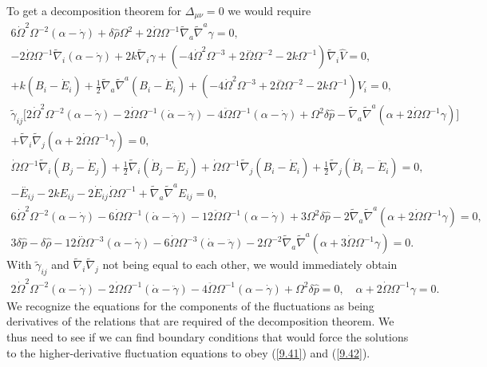 \documentclass[aps,onecolumn,10pt]{revtex4}
\numberwithin{equation}{section}
\numberwithin{equation}{section}
\begin{document}
To get a decomposition theorem for $\Delta_{\mu\nu}=0$ we would require 
%
\begin{eqnarray}
6 \dot{\Omega}^2 \Omega^{-2}(\alpha-\dot\gamma) + \delta \hat{\rho}{} \Omega^2 + 2 \dot{\Omega} \Omega^{-1} \tilde{\nabla}_{a}\tilde{\nabla}^{a}\gamma=0,&& 
\nonumber\\
 -2 \dot{\Omega} \Omega^{-1} \tilde{\nabla}_{i}(\alpha - \dot\gamma) + 2 k \tilde{\nabla}_{i}\gamma 
+(-4 \dot{\Omega}^2 \Omega^{-3}  + 2 \overset{..}{\Omega} \Omega^{-2}  - 2 k \Omega^{-1}) \tilde{\nabla}_{i}\hat{V}=0,&&
\nonumber\\
 +k(B_i-\dot E_i)+ \tfrac{1}{2} \tilde{\nabla}_{a}\tilde{\nabla}^{a}(B_{i} - \dot{E}_{i})
+ (-4 \dot{\Omega}^2 \Omega^{-3} + 2 \overset{..}{\Omega} \Omega^{-2} - 2 k \Omega^{-1})V_{i}=0,&&
\nonumber\\
 \tilde{\gamma}_{ij}\big[ 2 \dot{\Omega}^2 \Omega^{-2}(\alpha-\dot\gamma)
-2  \dot{\Omega} \Omega^{-1}(\dot\alpha -\ddot\gamma)-4\ddot\Omega\Omega^{-1}(\alpha-\dot\gamma)+ \Omega^2 \delta \hat{p}-\tilde\nabla_a\tilde\nabla^a( \alpha + 2\dot\Omega \Omega^{-1}\gamma) \big] &&
\nonumber\\
+\tilde\nabla_i\tilde\nabla_j( \alpha + 2\dot\Omega \Omega^{-1}\gamma)=0,&&
\nonumber\\
\dot{\Omega} \Omega^{-1} \tilde{\nabla}_{i}(B_{j}-\dot E_j)+\tfrac{1}{2} \tilde{\nabla}_{i}(\dot{B}_{j}-\ddot{E}_j)
+\dot{\Omega} \Omega^{-1} \tilde{\nabla}_{j}(B_{i}-\dot E_i)+\tfrac{1}{2} \tilde{\nabla}_{j}(\dot{B}_{i}-\ddot{E}_i)=0,&&
\nonumber\\
- \overset{..}{E}_{ij} - 2 k E_{ij} - 2 \dot{E}_{ij} \dot{\Omega} \Omega^{-1} + \tilde{\nabla}_{a}\tilde{\nabla}^{a}E_{ij}=0,&&
\nonumber\\
 6 \dot{\Omega}^2 \Omega^{-2}(\alpha-\dot\gamma)
-6  \dot{\Omega} \Omega^{-1}(\dot\alpha -\ddot\gamma)-12\ddot\Omega\Omega^{-1}(\alpha-\dot\gamma)+ 3\Omega^2 \delta \hat{p}-2\tilde\nabla_a\tilde\nabla^a( \alpha + 2\dot\Omega \Omega^{-1}\gamma)=0,&&
\nonumber\\
3 \delta \hat{p}{} -  \delta \hat{\rho}
-12 \overset{..}{\Omega}  \Omega^{-3}(\alpha - \dot\gamma) -6 \dot{\Omega} \Omega^{-3}(\dot{\alpha} -\ddot\gamma)
-2 \Omega^{-2} \tilde{\nabla}_{a}\tilde{\nabla}^{a}(\alpha +3\dot\Omega\Omega^{-1}\gamma)=0.&&
\label{9.41}
\end{eqnarray}
%
With $\tilde{\gamma}_{ij}$ and $\tilde{\nabla}_{i}\tilde{\nabla}_j$ not being equal to each other, we would immediately obtain 
%
\begin{eqnarray}
2 \dot{\Omega}^2 \Omega^{-2}(\alpha-\dot\gamma)
-2  \dot{\Omega} \Omega^{-1}(\dot\alpha -\ddot\gamma)-4\ddot\Omega\Omega^{-1}(\alpha-\dot\gamma)+ \Omega^2 \delta \hat{p}  =0,\quad  \alpha + 2\dot\Omega \Omega^{-1}\gamma=0.
\label{9.42}
\end{eqnarray}
%
We recognize the equations for the components of the fluctuations as being derivatives of the relations that are required of the decomposition theorem. We thus need to see if we can find boundary conditions that would force the solutions to the higher-derivative fluctuation equations to obey (\ref{9.41}) and (\ref{9.42}).
\end{document}
